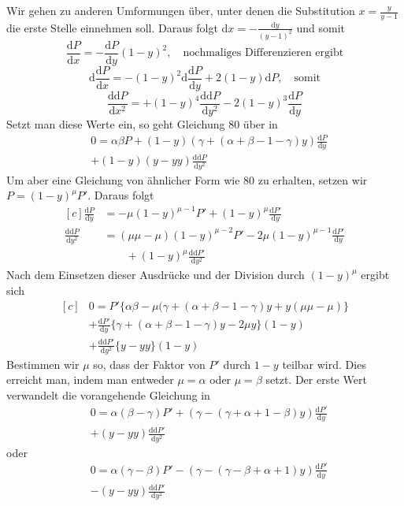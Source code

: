 Wir gehen zu anderen Umformungen über, unter denen die Substitution $x=\frac{y}{y-1}$ die erste Stelle einnehmen soll. Daraus folgt $\mathrm{d}x=-\frac{\mathrm{d}y}{(y-1)^2}$ und somit
\[
\frac{\mathrm{d}P}{\mathrm{d}x}=-\frac{\mathrm{d}P}{\mathrm{d}y}(1-y)^2,
\quad\text{nochmaliges Differenzieren ergibt}
\]
\[
\mathrm{d}\frac{\mathrm{d}P}{\mathrm{d}x}=-(1-y)^2\mathrm{d}\frac{\mathrm{d}P}{\mathrm{d}y}
+2(1-y)\mathrm{d}P,\quad\text{somit}
\]
\[
\frac{\mathrm{dd}P}{\mathrm{d}x^2}=+(1-y)^4\frac{\mathrm{dd}P}{\mathrm{d}y^2}
-2(1-y)^3\frac{\mathrm{d}P}{\mathrm{d}y}
\]
Setzt man diese Werte ein, so geht Gleichung 80 über in
\[
\begin{aligned}&0=\alpha\beta P+(1-y)(\gamma+(\alpha+\beta-1-\gamma)y)\frac{\mathrm{d}P}{\mathrm{d}y}\\&+(1-y)(y-yy)\frac{\mathrm{dd}P}{\mathrm{d}y^2}\end{aligned}
\]
Um aber eine Gleichung von ähnlicher Form wie 80 zu erhalten, setzen wir $P=(1-y)^\mu P'$. Daraus folgt
\[
\begin{aligned}[c]
\frac{\mathrm{d}P}{\mathrm{d}y}
&=-\mu(1-y)^{\mu-1}P'+(1-y)^\mu\frac{\mathrm{d}P'}{\mathrm{d}y}\\
\frac{\mathrm{dd}P}{\mathrm{d}y^2}
&=(\mu\mu-\mu)(1-y)^{\mu-2}P'-2\mu(1-y)^{\mu-1}\frac{\mathrm{d}P'}{\mathrm{d}y}
\\&\qquad+(1-y)^\mu\frac{\mathrm{dd}P'}{\mathrm{d}y^2}
\end{aligned}
\]
Nach dem Einsetzen dieser Ausdrücke und der Division durch $(1-y)^\mu$ ergibt sich
\[
\begin{aligned}[c]
&0=P'\{\alpha\beta-\mu(\gamma+(\alpha+\beta-1-\gamma)y+y(\mu\mu-\mu)\}\\
&+\frac{\mathrm{d}P'}{\mathrm{d}y}\{\gamma+(\alpha+\beta-1-\gamma)y-2\mu y\}(1-y)\\
&+\frac{\mathrm{dd}P'}{\mathrm{d}y^2}\{y-yy\}(1-y)
\end{aligned}
\]
Bestimmen wir $\mu$ so, dass der Faktor von $P'$ durch $1-y$ teilbar wird. Dies erreicht man, indem man entweder $\mu=\alpha$ oder $\mu=\beta$ setzt. Der erste Wert verwandelt die vorangehende Gleichung in
\[
\begin{aligned}&0=\alpha(\beta-\gamma)P'+(\gamma-(\gamma+\alpha+1-\beta)y)\frac{\mathrm{d}P'}{\mathrm{d}y}\\&+(y-yy)\frac{\mathrm{dd}P'}{\mathrm{d}y^2}\end{aligned}
\]
oder
\[
\begin{aligned}&0=\alpha(\gamma-\beta)P'-(\gamma-(\gamma-\beta+\alpha+1)y)\frac{\mathrm{d}P'}{\mathrm{d}y}\\&-(y-yy)\frac{\mathrm{dd}P'}{\mathrm{d}y^2}\end{aligned}
\]
